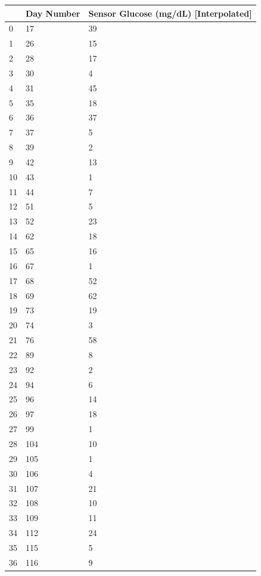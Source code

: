 \bigskip\noindent
\begin{tabular}{p{}p{}p{}}
\toprule
 & Day Number & Sensor Glucose (mg/dL) [Interpolated] \\
\hline
0 & 17 & 39 \\
\hline
1 & 26 & 15 \\
\hline
2 & 28 & 17 \\
\hline
3 & 30 & 4 \\
\hline
4 & 31 & 45 \\
\hline
5 & 35 & 18 \\
\hline
6 & 36 & 37 \\
\hline
7 & 37 & 5 \\
\hline
8 & 39 & 2 \\
\hline
9 & 42 & 13 \\
\hline
10 & 43 & 1 \\
\hline
11 & 44 & 7 \\
\hline
12 & 51 & 5 \\
\hline
13 & 52 & 23 \\
\hline
14 & 62 & 18 \\
\hline
15 & 65 & 16 \\
\hline
16 & 67 & 1 \\
\hline
17 & 68 & 52 \\
\hline
18 & 69 & 62 \\
\hline
19 & 73 & 19 \\
\hline
20 & 74 & 3 \\
\hline
21 & 76 & 58 \\
\hline
22 & 89 & 8 \\
\hline
23 & 92 & 2 \\
\hline
24 & 94 & 6 \\
\hline
25 & 96 & 14 \\
\hline
26 & 97 & 18 \\
\hline
27 & 99 & 1 \\
\hline
28 & 104 & 10 \\
\hline
29 & 105 & 1 \\
\hline
30 & 106 & 4 \\
\hline
31 & 107 & 21 \\
\hline
32 & 108 & 10 \\
\hline
33 & 109 & 11 \\
\hline
34 & 112 & 24 \\
\hline
35 & 115 & 5 \\
\hline
36 & 116 & 9 \\

\end{tabular}
